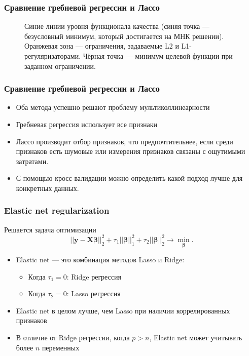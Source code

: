 \documentclass[ucs, notheorems, handout]{beamer}
\begin{document}
\begin{frame}
	\frametitle{Сравнение гребневой регрессии и Лассо}
	\begin{figure}[]
		
		Синие линии уровня функционала качества (синяя точка --- безусловный минимум, который достигается на МНК решении). Оранжевая зона --- ограничения, задаваемые L2 и L1-регуляризаторами. Чёрная точка --- минимум целевой функции при заданном ограничении.
	\end{figure}
\end{frame}


\begin{frame}
	\frametitle{Сравнение гребневой регрессии и Лассо}
	
	\vspace{0.8cm}
	\begin{itemize}
		\item Оба метода успешно решают проблему мультиколлинеарности
		\item Гребневая регрессия использует все признаки
		\item Лассо производит отбор признаков, что предпочтительнее, если среди признаков есть шумовые или измерения признаков связаны с ощутимыми затратами.
		\item С помощью кросс-валидации можно определить какой подход лучше для конкретных данных.
	\end{itemize}
\end{frame}

\begin{frame}
	\frametitle{Elastic net regularization}
	Решается задача оптимизации
	\begin{equation*}
		||\bm y-\bm {X} \bm \beta||_{2}^{2} + \tau_{1}||\bm \beta||_{1}^{2}+\tau_{2}||\bm \beta||_{2}^{2}
		\rightarrow\min_{\bm \beta}.
	\end{equation*}
	\begin{itemize}
		\item[\checkmark] Elastic net --- это комбинация методов Lasso и Ridge:
		\begin{itemize}
			\item Когда $\tau_1 = 0$: Ridge регрессия
			\item Когда $\tau_2 = 0$: Lasso регрессия
		\end{itemize}
		\item[\checkmark] Elastic net в целом лучше, чем Lasso при наличии коррелированных признаков
		\item[\checkmark] В отличие от Ridge регрессии, когда $p > n$, Elastic net может учитывать более $n$ переменных

	\end{itemize}
\end{frame}
\end{document}
